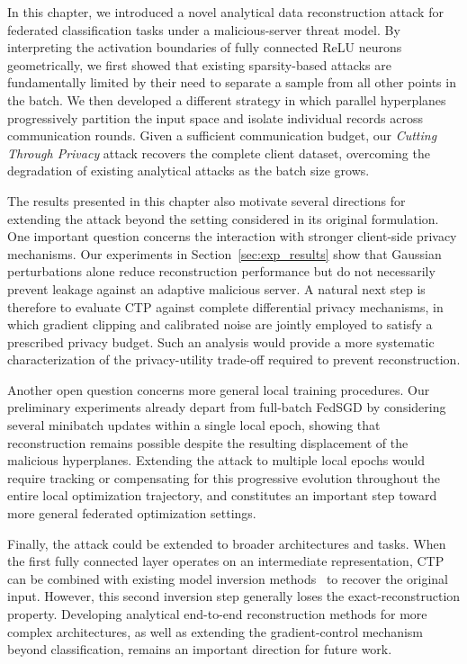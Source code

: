 In this chapter, we introduced a novel analytical data reconstruction attack for federated classification tasks under a malicious-server threat model. By interpreting the activation boundaries of fully connected ReLU neurons geometrically, we first showed that existing sparsity-based attacks are fundamentally limited by their need to separate a sample from all other points in the batch. We then developed a different strategy in which parallel hyperplanes progressively partition the input space and isolate individual records across communication rounds. Given a sufficient communication budget, our \emph{Cutting Through Privacy} attack recovers the complete client dataset, overcoming the degradation of existing analytical attacks as the batch size grows.

The results presented in this chapter also motivate several directions for extending the attack beyond the setting considered in its original formulation. One important question concerns the interaction with stronger client-side privacy mechanisms. Our experiments in Section~\ref{sec:exp_results} show that Gaussian perturbations alone reduce reconstruction performance but do not necessarily prevent leakage against an adaptive malicious server. A natural next step is therefore to evaluate CTP against complete differential privacy mechanisms, in which gradient clipping and calibrated noise are jointly employed to satisfy a prescribed privacy budget. Such an analysis would provide a more systematic characterization of the privacy-utility trade-off required to prevent reconstruction.

Another open question concerns more general local training procedures. Our preliminary experiments already depart from full-batch FedSGD by considering several minibatch updates within a single local epoch, showing that reconstruction remains possible despite the resulting displacement of the malicious hyperplanes. Extending the attack to multiple local epochs would require tracking or compensating for this progressive evolution throughout the entire local optimization trajectory, and constitutes an important step toward more general federated optimization settings.

Finally, the attack could be extended to broader architectures and tasks. When the first fully connected layer operates on an intermediate representation, CTP can be combined with existing model inversion methods~\cite{kariyappaCocktailPartyAttack2023, ZHANG2023119421} to recover the original input. However, this second inversion step generally loses the exact-reconstruction property. Developing analytical end-to-end reconstruction methods for more complex architectures, as well as extending the gradient-control mechanism beyond classification, remains an important direction for future work.



